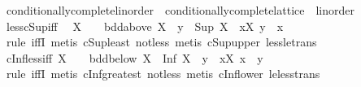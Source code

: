 \begin{isabellebody}
\endisatagproof
{\isafoldproof}%
%
\isadelimproof
\isanewline
%
\endisadelimproof
\isanewline
{}\isamarkupfalse%
\ conditionally{\isacharunderscore}{\kern0pt}complete{\isacharunderscore}{\kern0pt}linorder\ {\isacharequal}{\kern0pt}\ conditionally{\isacharunderscore}{\kern0pt}complete{\isacharunderscore}{\kern0pt}lattice\ {\isacharplus}{\kern0pt}\ linorder\isanewline
{}\isanewline
\isanewline
{}\isamarkupfalse%
\ less{\isacharunderscore}{\kern0pt}cSup{\isacharunderscore}{\kern0pt}iff{\isacharcolon}{\kern0pt}\isanewline
\ \ {\isachardoublequoteopen}X\ {\isasymnoteq}\ {\isacharbraceleft}{\kern0pt}{\isacharbraceright}{\kern0pt}\ {\isasymLongrightarrow}\ bdd{\isacharunderscore}{\kern0pt}above\ X\ {\isasymLongrightarrow}\ y\ {\isacharless}{\kern0pt}\ Sup\ X\ {\isasymlongleftrightarrow}\ {\isacharparenleft}{\kern0pt}{\isasymexists}x{\isasymin}X{\isachardot}{\kern0pt}\ y\ {\isacharless}{\kern0pt}\ x{\isacharparenright}{\kern0pt}{\isachardoublequoteclose}\isanewline
%
\isadelimproof
\ \ %
\endisadelimproof
%
\isatagproof
{}\isamarkupfalse%
\ {\isacharparenleft}{\kern0pt}rule\ iffI{\isacharparenright}{\kern0pt}\ {\isacharparenleft}{\kern0pt}metis\ cSup{\isacharunderscore}{\kern0pt}least\ not{\isacharunderscore}{\kern0pt}less{\isacharcomma}{\kern0pt}\ metis\ cSup{\isacharunderscore}{\kern0pt}upper\ less{\isacharunderscore}{\kern0pt}le{\isacharunderscore}{\kern0pt}trans{\isacharparenright}{\kern0pt}%
\endisatagproof
{\isafoldproof}%
%
\isadelimproof
\isanewline
%
\endisadelimproof
\isanewline
{}\isamarkupfalse%
\ cInf{\isacharunderscore}{\kern0pt}less{\isacharunderscore}{\kern0pt}iff{\isacharcolon}{\kern0pt}\ {\isachardoublequoteopen}X\ {\isasymnoteq}\ {\isacharbraceleft}{\kern0pt}{\isacharbraceright}{\kern0pt}\ {\isasymLongrightarrow}\ bdd{\isacharunderscore}{\kern0pt}below\ X\ {\isasymLongrightarrow}\ Inf\ X\ {\isacharless}{\kern0pt}\ y\ {\isasymlongleftrightarrow}\ {\isacharparenleft}{\kern0pt}{\isasymexists}x{\isasymin}X{\isachardot}{\kern0pt}\ x\ {\isacharless}{\kern0pt}\ y{\isacharparenright}{\kern0pt}{\isachardoublequoteclose}\isanewline
%
\isadelimproof
\ \ %
\endisadelimproof
%
\isatagproof
{}\isamarkupfalse%
\ {\isacharparenleft}{\kern0pt}rule\ iffI{\isacharparenright}{\kern0pt}\ {\isacharparenleft}{\kern0pt}metis\ cInf{\isacharunderscore}{\kern0pt}greatest\ not{\isacharunderscore}{\kern0pt}less{\isacharcomma}{\kern0pt}\ metis\ cInf{\isacharunderscore}{\kern0pt}lower\ le{\isacharunderscore}{\kern0pt}less{\isacharunderscore}{\kern0pt}trans{\isacharparenright}{\kern0pt}%

\end{isabellebody}
